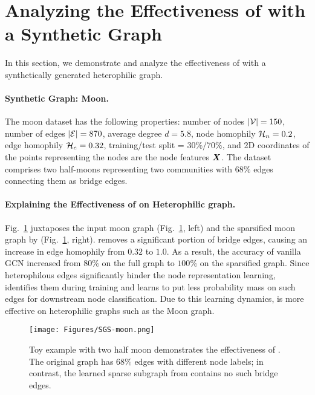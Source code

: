 \section{Analyzing the Effectiveness of \sgs with a Synthetic Graph}
\label{app:toymoon}
In this section, we demonstrate and analyze the effectiveness of \sgs with a synthetically generated heterophilic graph.

\paragraph{Synthetic Graph: Moon.}
The moon dataset has the following properties: number of nodes $|{\mathcal{V}}|=150$, number of edges $|{\mathcal{E}}|=870$, average degree $d=5.8$, node homophily ${\mathcal{H}}_n=0.2$, edge homophily ${\mathcal{H}}_e = 0.32$, training/test split = $30\%/70\%$, and 2D coordinates of the points representing the nodes are the node features ${\bm{X}}$.
The dataset comprises two half-moons representing two communities with $68\%$ edges connecting them as bridge edges.



\paragraph{Explaining the Effectiveness of \sgs on Heterophilic graph.} Fig.~\ref{fig:moongraph} juxtaposes the input moon graph (Fig.~\ref{fig:moongraph}, left) and the sparsified moon graph by \sgs (Fig.~\ref{fig:moongraph}, right). \sgs removes a significant portion of bridge edges, causing an increase in edge homophily from $0.32$ to $1.0$. As a result, the accuracy of vanilla GCN increased from $80\%$ on the full graph to $100\%$ on the sparsified graph. Since heterophilous edges significantly hinder the node representation learning, \sgs identifies them during training and learns to put less probability mass on such edges for downstream node classification. 
Due to this learning dynamics, \sgs is more effective on heterophilic graphs such as the Moon graph.

\begin{figure}[!htbp]
\centering
\texttt{[image: Figures/SGS-moon.png]}
\caption{Toy example with two half moon demonstrates the effectiveness of \sgs. The original graph has $68\%$ edges with different node labels; in contrast, the learned sparse subgraph from \sgs contains no such bridge edges.}
\label{fig:moongraph}
\end{figure}

